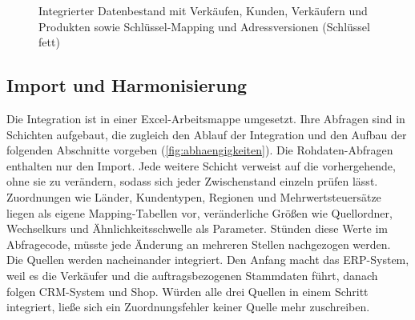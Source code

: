 \documentclass[a4paper,12pt]{article}
\begin{document}
\begin{figure}[H]
{}
\caption{Integrierter Datenbestand mit Verkäufen, Kunden, Verkäufern und Produkten sowie Schlüssel-Mapping und Adressversionen (Schlüssel fett)}
\label{fig:zielschema}
\end{figure}

\subsection{Import und Harmonisierung}\label{sec:integration}

Die Integration ist in einer Excel-Arbeitsmappe umgesetzt. Ihre Abfragen sind in Schichten aufgebaut, die zugleich den Ablauf der Integration und den Aufbau der folgenden Abschnitte vorgeben (\cref{fig:abhaengigkeiten}). Die Rohdaten-Abfragen enthalten nur den Import. Jede weitere Schicht verweist auf die vorhergehende, ohne sie zu verändern, sodass sich jeder Zwischenstand einzeln prüfen lässt. Zuordnungen wie Länder, Kundentypen, Regionen und Mehrwertsteuersätze liegen als eigene Mapping-Tabellen vor, veränderliche Größen wie Quellordner, Wechselkurs und Ähnlichkeitsschwelle als Parameter. Stünden diese Werte im Abfragecode, müsste jede Änderung an mehreren Stellen nachgezogen werden. Die Quellen werden nacheinander integriert. Den Anfang macht das ERP-System, weil es die Verkäufer und die auftragsbezogenen Stammdaten führt, danach folgen CRM-System und Shop. Würden alle drei Quellen in einem Schritt integriert, ließe sich ein Zuordnungsfehler keiner Quelle mehr zuschreiben.
\end{document}
